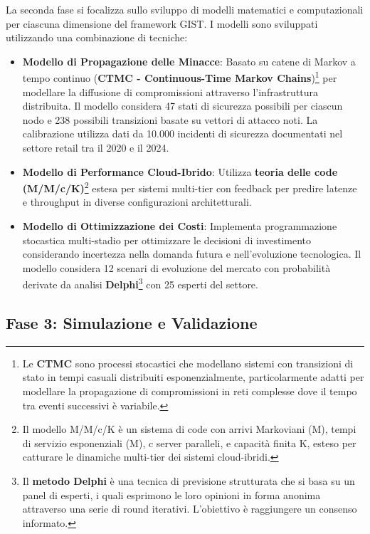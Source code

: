 \label{ssec:fase2}
La seconda fase si focalizza sullo sviluppo di modelli matematici e computazionali per ciascuna dimensione del framework GIST. I modelli sono sviluppati utilizzando una combinazione di tecniche:
\begin{itemize}
    \item \textbf{Modello di Propagazione delle Minacce}: Basato su catene di Markov a tempo continuo (\textbf{CTMC - Continuous-Time Markov Chains})\footnote{Le \textbf{CTMC} sono processi stocastici che modellano sistemi con transizioni di stato in tempi casuali distribuiti esponenzialmente, particolarmente adatti per modellare la propagazione di compromissioni in reti complesse dove il tempo tra eventi successivi è variabile.} per modellare la diffusione di compromissioni attraverso l'infrastruttura distribuita. Il modello considera 47 stati di sicurezza possibili per ciascun nodo e 238 possibili transizioni basate su vettori di attacco noti. La calibrazione utilizza dati da 10.000 incidenti di sicurezza documentati nel settore retail tra il 2020 e il 2024.
\item \textbf{Modello di Performance Cloud-Ibrido}: Utilizza \textbf{teoria delle code (M/M/c/K)}\footnote{Il modello M/M/c/K è un sistema di code con arrivi Markoviani (M), tempi di servizio esponenziali (M), c server paralleli, e capacità finita K, esteso per catturare le dinamiche multi-tier dei sistemi cloud-ibridi.} estesa per sistemi multi-tier con feedback per predire latenze e throughput in diverse configurazioni architetturali. 
\item \textbf{Modello di Ottimizzazione dei Costi}: Implementa programmazione stocastica multi-stadio per ottimizzare le decisioni di investimento considerando incertezza nella domanda futura e nell'evoluzione tecnologica. Il modello considera 12 scenari di evoluzione del mercato con probabilità derivate da analisi \textbf{Delphi}\footnote{Il \textbf{metodo Delphi} è una tecnica di previsione strutturata che si basa su un panel di esperti, i quali esprimono le loro opinioni in forma anonima attraverso una serie di round iterativi. L'obiettivo è raggiungere un consenso informato.} con 25 esperti del settore.

\end{itemize}

\subsection{Fase 3: Simulazione e Validazione}

